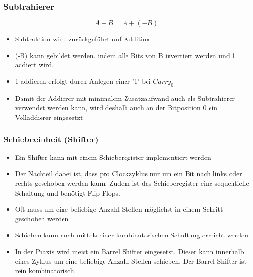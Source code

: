 \subsubsection{Subtrahierer}
\begin{equation}
A-B = A + (-B)	
\end{equation}
\begin{itemize}
	\item Subtraktion wird zurückgeführt auf Addition
	\item (-B) kann gebildet werden, indem alle Bits von B invertiert werden und 1 addiert wird.
	\item 1 addieren erfolgt durch Anlegen einer '1' bei $Carry_0$
	\item Damit der Addierer mit minimalem Zusatzaufwand auch als Subtrahierer verwendet werden kann, wird deshalb auch an der Bitposition 0 ein Volladdierer eingesetzt
\end{itemize}

\subsubsection{Schiebeeinheit (Shifter)}
\begin{itemize}
	\item Ein Shifter kann mit einem Schieberegister implementiert werden
	\item Der Nachteil dabei ist, dass pro Clockzyklus nur um ein Bit nach links oder rechts geschoben werden kann. Zudem ist das Schieberegister eine sequentielle Schaltung und benötigt Flip Flops.
	\item Oft muss um eine beliebige Anzahl Stellen möglichst  in einem Schritt geschoben werden
	\item Schieben kann auch mittels einer kombinatorischen Schaltung erreicht werden 
	\item In der Praxis wird meist ein Barrel Shifter eingesetzt. Dieser kann innerhalb eines Zyklus um eine beliebige Anzahl Stellen schieben. Der Barrel Shifter ist rein kombinatorisch.	
\end{itemize}

